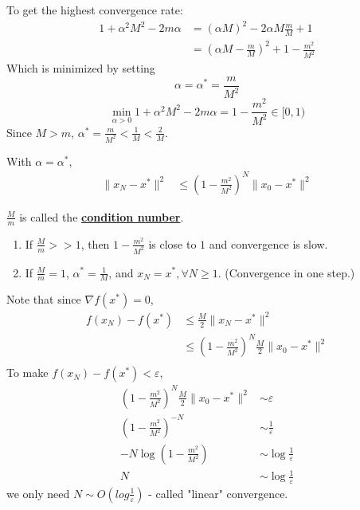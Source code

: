 \documentclass[11pt,a4paper]{article}
\begin{document}
To get the highest convergence rate:
\begin{equation}
    \begin{aligned}
        1+\alpha^2M^2-2m\alpha&=(\alpha M)^2-2\alpha M\frac{m}{M}+1\\
        &=(\alpha M-\frac{m}{M})^2+1-\frac{m^2}{M^2}
    \end{aligned}
    \nonumber
\end{equation}
Which is minimized by setting $$\alpha=\alpha^*=\frac{m}{M^2}$$
$$\min_{\alpha>0}1+\alpha^2M^2-2m\alpha=1-\frac{m^2}{M^2}\in[0,1)$$
Since $M>m$, $\alpha^*=\frac{m}{M^2}<\frac{1}{M}<\frac{2}{M}$.

With $\alpha=\alpha^*$,
\begin{equation}
    \begin{aligned}
        \|x_{N}-x^*\|^2&\leq (1-\frac{m^2}{M^2})^N\|x_0-x^*\|^2
    \end{aligned}
    \nonumber
\end{equation}

$\frac{M}{m}$ is called the \textbf{\underline{condition number}}.
\begin{enumerate}[$\bullet$]
    \item If $\frac{M}{m}>>1$, then $1-\frac{m^2}{M^2}$ is close to $1$ and convergence is slow.
    \item If $\frac{M}{m}=1$, $\alpha^*=\frac{1}{M}$, and $x_N=x^*,\forall N\geq 1$. (Convergence in one step.)
\end{enumerate}
Note that since $\nabla f(x^*)=0$,
\begin{equation}
    \begin{aligned}
        f(x_N)-f(x^*)&\leq \frac{M}{2}\|x_N-x^*\|^2\\
        &\leq (1-\frac{m^2}{M^2})^N\frac{M}{2}\|x_0-x^*\|^2\\
    \end{aligned}
    \nonumber
\end{equation}
To make $f(x_N)-f(x^*)<\varepsilon$,
\begin{equation}
    \begin{aligned}
        (1-\frac{m^2}{M^2})^N\frac{M}{2}\|x_0-x^*\|^2&\sim \varepsilon\\
        (1-\frac{m^2}{M^2})^{-N}&\sim \frac{1}{\varepsilon}\\
        -N\log(1-\frac{m^2}{M^2})&\sim\log\frac{1}{\varepsilon}\\
        N&\sim \log\frac{1}{\varepsilon}
    \end{aligned}
    \nonumber
\end{equation}
we only need $N\sim O(log\frac{1}{\varepsilon})$ - called "linear" convergence.
\end{document}
